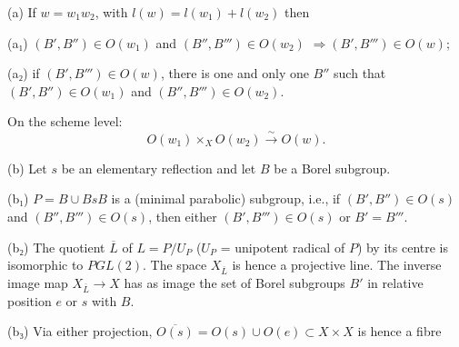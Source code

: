 \documentclass[9pt,twoside]{extarticle}
\begin{document}
{(a) If \(w=w_1w_2\), with \(l(w)=l(w_1)+l(w_2)\) then\par

(a₁) \((B',B'')\in O(w_1)\) and \((B'',B''')\in O(w_2)\)  \(\Rightarrow (B',B''')\in O(w)\);\par

(a₂) if \((B',B''')\in O(w)\), there is one and only one \(B''\) such that \((B',B'')\in O(w_1)\) and \((B'',B''')\in O(w_2)\).\par

On the scheme level: \[
O(w_1)\times_X O(w_2)\xrightarrow{\sim}O(w).
\]\par

(b) Let \(s\) be an elementary reflection and let \(B\) be a Borel subgroup.\par

(b₁) \(P=B\cup BsB\) is a (minimal parabolic) subgroup, i.e., if \((B',B'')\in O(s)\) and \((B'',B''')\in O(s)\), then either \((B',B''')\in O(s)\) or \(B'=B'''\).\par

(b₂) The quotient \(\overline{L}\) of \(L=P/U_P\) (\(U_P\) = unipotent radical of \(P\)) by its centre is isomorphic to \(PGL(2)\). The space \(X_{\overline{L}}\) is hence a projective line. The inverse image map \(X_{\overline{L}}\to X\) has as image the set of Borel subgroups \(B'\) in relative position \(e\) or \(s\) with \(B\).\par

(b₃) Via either projection, \(\overline{O(s)}=O(s)\cup O(e)\subset X\times X\) is hence a fibre\par
}
\end{document}
